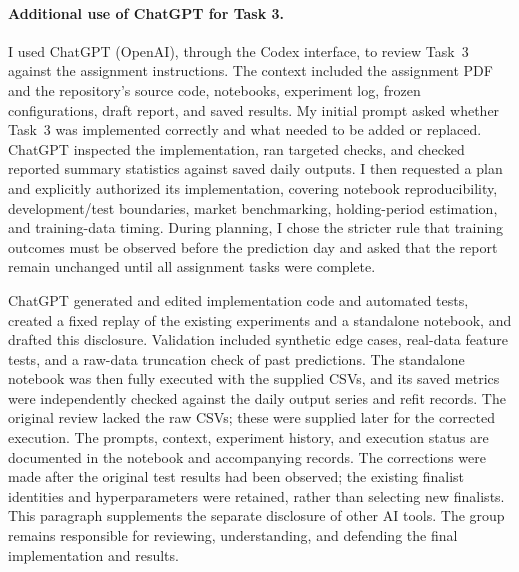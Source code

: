 \paragraph{Additional use of ChatGPT for Task 3.}
I used ChatGPT (OpenAI), through the Codex interface, to review Task~3
against the assignment instructions. The context included the assignment
PDF and the repository's source code, notebooks, experiment log, frozen
configurations, draft report, and saved results. My initial prompt asked
whether Task~3 was implemented correctly and what needed to be added or
replaced. ChatGPT inspected the implementation, ran targeted checks,
and checked reported summary statistics against saved daily outputs.
I then requested a plan and explicitly authorized its implementation,
covering notebook reproducibility, development/test boundaries, market
benchmarking, holding-period estimation, and training-data timing.
During planning, I chose the stricter rule that training outcomes must
be observed before the prediction day and asked that the report remain
unchanged until all assignment tasks were complete.

ChatGPT generated and edited implementation code and automated tests,
created a fixed replay of the existing experiments and a standalone
notebook, and drafted this disclosure. Validation included synthetic
edge cases, real-data feature tests, and a raw-data truncation check of
past predictions. The standalone notebook was then fully executed with
the supplied CSVs, and its saved metrics were independently checked
against the daily output series and refit records. The original review
lacked the raw CSVs; these were
supplied later for the corrected execution. The prompts, context,
experiment history, and execution status are documented in the notebook
and accompanying records. The corrections were made after the original
test results had been observed; the existing finalist identities and
hyperparameters were retained, rather than selecting new finalists.
This paragraph supplements the separate disclosure of other AI tools.
The group remains responsible for reviewing, understanding, and defending
the final implementation and results.
